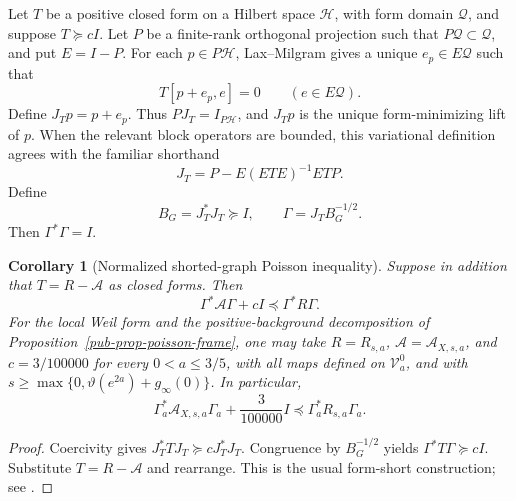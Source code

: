 \documentclass[11pt]{article}
\newtheorem{corollary}[theorem]{Corollary}
\theoremstyle{remark}
\begin{document}
Let \(T\) be a positive closed form on a Hilbert space \(\mathcal H\),
with form domain \(\mathcal Q\), and suppose \(T\succeq cI\).
Let \(P\) be a finite-rank orthogonal projection such that \(P\mathcal Q\subset\mathcal Q\), and put \(E=I-P\).
For each \(p\in P\mathcal H\),
Lax--Milgram gives a unique \(e_p\in E\mathcal Q\) such that
\begin{equation}
 T[p+e_p,e]=0\qquad(e\in E\mathcal Q).
\label{pub-eq-minimizing-graph-variational}
\end{equation}
Define \(J_Tp=p+e_p\).
Thus \(PJ_T=I_{P\mathcal H}\), and \(J_Tp\) is the unique form-minimizing lift of \(p\).
When the relevant block operators are bounded,
this variational definition agrees with the familiar shorthand
\begin{equation}
 J_T=P-E(ETE)^{-1}ETP.
\label{pub-eq-minimizing-graph}
\end{equation}
Define
\begin{equation}
 B_G=J_T^*J_T\succeq I,
 \qquad
 \Gamma=J_TB_G^{-1/2}.
\label{pub-eq-normalized-graph}
\end{equation}
Then \(\Gamma^*\Gamma=I\).

\begin{corollary}[Normalized shorted-graph Poisson inequality]
\label{pub-cor-normalized-graph}
Suppose in addition that \(T=R-\mathscr A\) as closed forms.
Then
\begin{equation}
          \Gamma^*\mathscr A\Gamma+cI
          \preceq\Gamma^*R\Gamma.
\label{pub-eq-normalized-loewner}
\end{equation}
For the local Weil form and the positive-background decomposition of Proposition~\ref{pub-prop-poisson-frame},
one may take \(R=R_{s,a}\), \(\mathscr A=\mathscr A_{X,s,a}\),
and \(c=3/100000\) for every \(0<a\leq3/5\), with all maps defined on \(\mathcal V_a^0\),
and with \(s\geq\max\{0,\vartheta(e^{2a})+g_\infty(0)\}\).
In particular,
\begin{equation}
 \Gamma_a^*\mathscr A_{X,s,a}\Gamma_a+\frac3{100000}I
 \preceq\Gamma_a^*R_{s,a}\Gamma_a.
\label{pub-eq-specific-poisson-loewner}
\end{equation}
\end{corollary}

\begin{proof}
Coercivity gives \(J_T^*TJ_T\succeq cJ_T^*J_T\).
Congruence by \(B_G^{-1/2}\) yields \(\Gamma^*T\Gamma\succeq cI\).
Substitute \(T=R-\mathscr A\) and rearrange.
This is the usual form-short construction; see \cite{AndersonTrapp1975,Kato1995}.
\end{proof}
\end{document}
